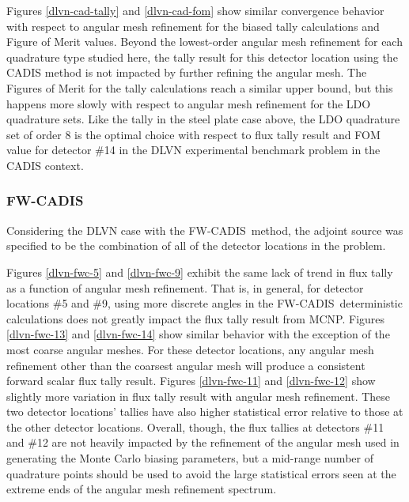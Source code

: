 \documentclass{article} %
\newcommand{\fwc}{\mbox{FW-CADIS}}
\begin{document}
Figures \ref{dlvn-cad-tally} and \ref{dlvn-cad-fom} show similar convergence
behavior with respect to angular mesh refinement for the biased tally
calculations and Figure of Merit values. Beyond the lowest-order angular mesh
refinement for each quadrature type studied here, the tally result for this
detector location using the CADIS method is not impacted by further refining
the angular mesh. The Figures of Merit for the tally calculations reach a
similar upper bound, but this happens more slowly with respect to angular mesh
refinement for the LDO quadrature sets. Like the tally in the steel plate case
above, the LDO quadrature set of order 8 is the optimal choice with respect to
flux tally result and FOM value for detector \#14 in the DLVN experimental
benchmark problem in the CADIS context.

\FloatBarrier
\subsubsection{\fwc}

Considering the DLVN case with the \fwc\ method, the adjoint source was
specified to be the combination of all of the detector locations in the
problem.

Figures \ref{dlvn-fwc-5} and \ref{dlvn-fwc-9} exhibit the same lack of trend in
flux tally as a function of angular mesh refinement. That is, in general, for
detector locations \#5 and \#9, using more discrete angles in the \fwc\
deterministic calculations does not greatly impact the flux tally result from
MCNP. Figures \ref{dlvn-fwc-13} and \ref{dlvn-fwc-14} show similar behavior
with the exception of the most coarse angular meshes. For these detector
locations, any angular mesh refinement other than the coarsest angular mesh
will produce a consistent forward scalar flux tally result. Figures
\ref{dlvn-fwc-11} and \ref{dlvn-fwc-12} show slightly more variation in flux
tally result with angular mesh refinement. These two detector locations'
tallies have also higher statistical error relative to those at the other
detector locations. Overall, though, the flux tallies at detectors \#11 and
\#12 are not heavily impacted by the refinement of the angular mesh used in
generating the Monte Carlo biasing parameters, but a mid-range number of
quadrature points should be used to avoid the large statistical errors seen at
the extreme ends of the angular mesh refinement spectrum.
\end{document}
